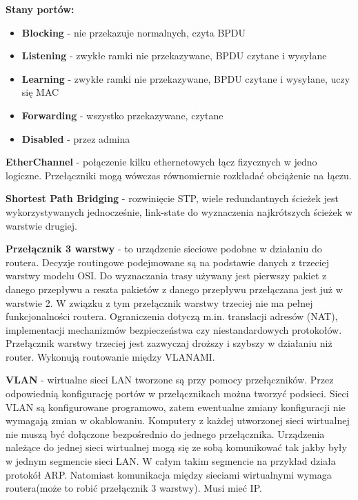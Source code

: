 \documentclass[../main.tex]{subfiles}
\begin{document}
    \textbf{Stany portów:}
    \begin{itemize}
        \item \textbf{Blocking} - nie przekazuje normalnych, czyta BPDU
        \item \textbf{Listening} - zwykłe ramki nie przekazywane, BPDU czytane i wysyłane
        \item \textbf{Learning} - zwykłe ramki nie przekazywane, BPDU czytane i wysyłane, uczy się MAC
        \item \textbf{Forwarding} - wszystko przekazywane, czytane
        \item \textbf{Disabled} - przez admina
    \end{itemize}

    \textbf{EtherChannel} - połączenie kilku ethernetowych łącz fizycznych w jedno logiczne.
    Przełączniki mogą wówczas równomiernie rozkładać obciążenie na łączu.

    \textbf{Shortest Path Bridging} - rozwinięcie STP, wiele redundantnych ścieżek jest
    wykorzystywanych jednocześnie, link-state do wyznaczenia najkrótszych ścieżek w warstwie
    drugiej.

    \textbf{Przełącznik 3 warstwy} - to urządzenie sieciowe podobne w działaniu do
    routera. Decyzje routingowe podejmowane są na podstawie danych z trzeciej warstwy modelu
    OSI. Do wyznaczania trasy używany jest pierwszy pakiet z danego przepływu a reszta
    pakietów z danego przepływu przełączana jest już w warstwie 2. W związku z tym przełącznik
    warstwy trzeciej nie ma pełnej funkcjonalności routera. Ograniczenia dotyczą m.in.
    translacji adresów (NAT), implementacji mechanizmów bezpieczeństwa czy niestandardowych
    protokołów. Przełącznik warstwy trzeciej jest zazwyczaj droższy i szybszy w działaniu
    niż router. Wykonują routowanie między VLANAMI.

    \textbf{VLAN} - wirtualne sieci LAN tworzone są przy pomocy przełączników. Przez
    odpowiednią konfigurację portów w przełącznikach można tworzyć podsieci. Sieci VLAN są
    konfigurowane programowo, zatem ewentualne zmiany konfiguracji nie wymagają zmian w
    okablowaniu. Komputery z każdej utworzonej sieci wirtualnej nie muszą być dołączone
    bezpośrednio do jednego przełącznika. Urządzenia należące do jednej sieci wirtualnej
    mogą się ze sobą komunikować tak jakby były w jednym segmencie sieci LAN. W całym takim
    segmencie na przykład działa protokół ARP. Natomiast komunikacja między sieciami
    wirtualnymi wymaga routera(może to robić przełącznik 3 warstwy). Musi mieć IP.
\end{document}
